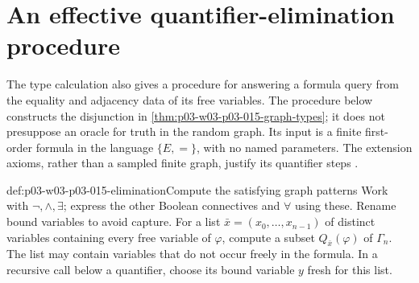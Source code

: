 \section{An effective quantifier-elimination procedure}
\label{sec:p03-w03-p03-015-effective-elimination}

The type calculation also gives a procedure for answering a formula query
from the equality and adjacency data of its free variables. The procedure
below constructs the disjunction in
\cref{thm:p03-w03-p03-015-graph-types}; it does not presuppose an oracle
for truth in the random graph. Its input is a finite first-order formula
in the language \(\{E,=\}\), with no named parameters. The extension
axioms, rather than a sampled finite graph, justify its quantifier steps
\cite{Fraisse1954,Rado1964}.

\begin{hbmethod}{def:p03-w03-p03-015-elimination}{Compute the satisfying graph patterns}
Work with \(\neg,\land,\exists\); express the other Boolean connectives
and \(\forall\) using these. Rename bound variables to avoid capture.
For a list \(\bar x=(x_0,\ldots,x_{n-1})\) of distinct variables
containing every free variable of \(\varphi\), compute a subset
\(Q_{\bar x}(\varphi)\) of \(\Gamma_n\). The list may contain variables
that do not occur freely in the formula. In a recursive call below a
quantifier, choose its bound variable \(y\) fresh for this list.


\end{hbmethod}
